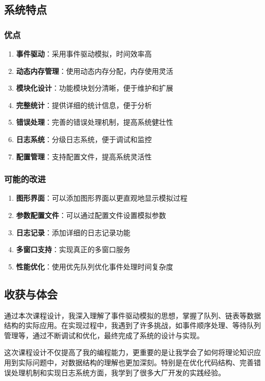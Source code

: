 \documentclass[12pt,a4paper]{article}
\begin{document}
\subsection{系统特点}
\subsubsection{优点}
\begin{enumerate}
\item \textbf{事件驱动}：采用事件驱动模拟，时间效率高
\item \textbf{动态内存管理}：使用动态内存分配，内存使用灵活
\item \textbf{模块化设计}：功能模块划分清晰，便于维护和扩展
\item \textbf{完整统计}：提供详细的统计信息，便于分析
\item \textbf{错误处理}：完善的错误处理机制，提高系统健壮性
\item \textbf{日志系统}：分级日志系统，便于调试和监控
\item \textbf{配置管理}：支持配置文件，提高系统灵活性
\end{enumerate}

\subsubsection{可能的改进}
\begin{enumerate}
\item \textbf{图形界面}：可以添加图形界面以更直观地显示模拟过程
\item \textbf{参数配置文件}：可以通过配置文件设置模拟参数
\item \textbf{日志记录}：添加详细的日志记录功能
\item \textbf{多窗口支持}：实现真正的多窗口服务
\item \textbf{性能优化}：使用优先队列优化事件处理时间复杂度
\end{enumerate}

\subsection{收获与体会}
通过本次课程设计，我深入理解了事件驱动模拟的思想，掌握了队列、链表等数据结构的实际应用。在实现过程中，我遇到了许多挑战，如事件顺序处理、等待队列管理等，通过不断调试和优化，最终完成了系统的设计与实现。

这次课程设计不仅提高了我的编程能力，更重要的是让我学会了如何将理论知识应用到实际问题中，对数据结构的理解也更加深刻。特别是在优化代码结构、完善错误处理机制和实现日志系统方面，我学到了很多大厂开发的实践经验。
\end{document}
